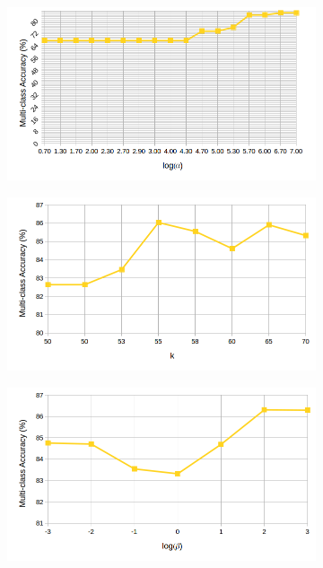 \begin{figure}[!h]
\begin{subfigure}[b]{0.3\linewidth}
  \end{subfigure}
    \begin{subfigure}[b]{0.3\linewidth}
    \includegraphics[width=\linewidth]{images/simple_gamma_awa}
  \end{subfigure}
  \begin{subfigure}[b]{0.3\linewidth}
    \includegraphics[width=\linewidth]{images/simple_k_awa}
  \end{subfigure}
    \begin{subfigure}[b]{0.3\linewidth}
    \includegraphics[width=\linewidth]{images/simple_beta_awa}

\end{subfigure}
\end{figure}
